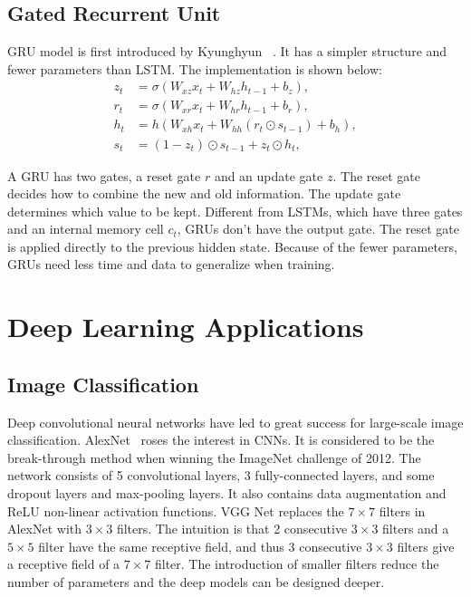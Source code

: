 \subsection{Gated Recurrent Unit}
GRU model is first introduced by Kyunghyun \etal~\cite{cho2014learning}. It has a simpler structure and fewer parameters than LSTM. The implementation is shown below:
\begin{align}
z_t &= \sigma{(W_{xz} x_t + W_{hz} h_{t-1} + b_z)}, \nonumber \\
r_t &= \sigma{(W_{xr} x_t + W_{hr} h_{t-1} + b_r)}, \nonumber \\
h_t &= h(W_{xh} x_t  + W_{hh} (r_t \odot s_{t-1}) + b_h), \nonumber \\
s_t &= (1-z_t) \odot s_{t-1}  + z_t \odot h_t, \nonumber
\end{align}

A GRU has two gates, a reset gate $r$ and an update gate $z$. The reset gate decides how to combine the new and old information. The update gate determines which value to be kept.
Different from LSTMs, which have three gates and an internal memory cell $c_t$, GRUs don't have the output gate. The reset gate is applied directly to the previous hidden state. Because of the fewer parameters, GRUs need less time and data to generalize when training.


\section{Deep Learning Applications} %
\subsection{Image Classification}
Deep convolutional neural networks have led to great success for large-scale image classification. AlexNet~\cite{krizhevsky2012imagenet} roses the interest in CNNs. It is considered to be the break-through method when winning the ImageNet challenge of 2012. The network consists of 5 convolutional layers, 3 fully-connected layers, and some dropout layers and max-pooling layers. It also contains data augmentation and ReLU non-linear activation functions. VGG Net\cite{simonyan2014very} replaces the $7\times 7$ filters in AlexNet with $3\times 3$ filters. The intuition is that 2 consecutive $3\times 3$ filters and a $5\times 5$ filter have the same receptive field, and thus 3 consecutive $3\times 3$ filters give a receptive field of a $7\times 7$ filter. The introduction of smaller filters reduce the number of parameters and the deep models can be designed deeper. 

